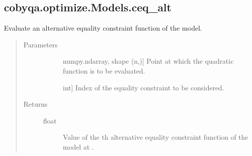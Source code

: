 \documentclass[letterpaper,10pt,english]{sphinxmanual}
\begin{document}
\begin{fulllineitems}
\begin{fulllineitems}
\begin{quote}
\begin{description}
\begin{description}
\end{description}

\end{description}\end{quote}

\end{fulllineitems}



\subsection{cobyqa.optimize.Models.ceq\_alt}
\label{\detokenize{refs/generated/cobyqa.optimize.Models.ceq_alt:cobyqa-optimize-models-ceq-alt}}\label{\detokenize{refs/generated/cobyqa.optimize.Models.ceq_alt::doc}}

\begin{fulllineitems}
\label{\detokenize{refs/generated/cobyqa.optimize.Models.ceq_alt:cobyqa.optimize.Models.ceq_alt}}
\sphinxAtStartPar
Evaluate an alternative equality constraint function of the model.
\begin{quote}\begin{description}
\item[{Parameters}] \leavevmode\begin{description}
\item[{}] \leavevmode{[}numpy.ndarray, shape (n,){]}
\sphinxAtStartPar
Point at which the quadratic function is to be evaluated.

\item[{}] \leavevmode{[}int{]}
\sphinxAtStartPar
Index of the equality constraint to be considered.

\end{description}

\item[{Returns}] \leavevmode\begin{description}
\item[{float}] \leavevmode
\sphinxAtStartPar
Value of the \sphinxhyphen{}th alternative equality constraint function of the
model at .

\end{description}

\end{description}\end{quote}


\end{fulllineitems}
\end{fulllineitems}
\end{document}
